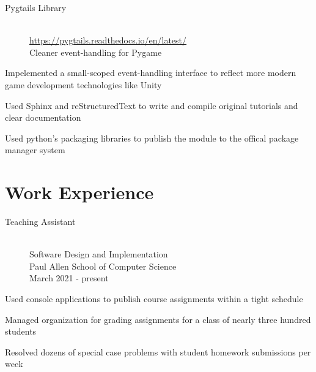 \documentclass[10pt]{article}
\newenvironment{itemize*}
{\begin{itemize}[leftmargin=*]
    \setlength{\parskip}{0.5pt}}
{\end{itemize}}
\begin{document}
\begin{paracol}{2}
\begin{description}
\item[Pygtails Library] \hfill \\
    \url{https://pygtails.readthedocs.io/en/latest/}\\
    Cleaner event-handling for Pygame
\end{description}
\begin{itemize*}
\item Impelemented a small-scoped event-handling interface to reflect more
      modern game development technologies like Unity
\item Used Sphinx and reStructuredText to write and compile original tutorials
      and clear documentation
\item Used python's packaging libraries to publish the module to the offical
      package manager system
\end{itemize*}

\switchcolumn
\section*{Work Experience}

\begin{description}
\item[Teaching Assistant] \hfill \\
    Software Design and Implementation \\
    Paul Allen School of Computer Science \\
    March 2021 - present
\end{description}
\begin{itemize*}
\item Used console applications to publish course assignments within a tight schedule
\item Managed organization for grading assignments for a class of nearly three
      hundred students
\item Resolved dozens of special case problems with student homework
      submissions per week
\end{itemize*}


\end{paracol}
\end{document}
